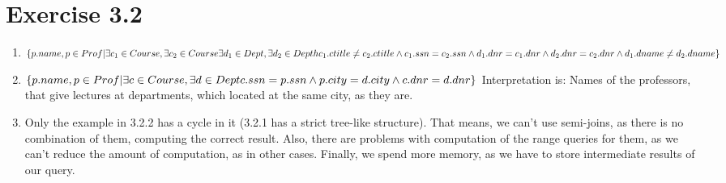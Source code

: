 \documentclass[10pt]{article}
\begin{document}
  \section*{Exercise 3.2}
  \begin{enumerate}[label=\arabic*.]
    \item
		$\{p.name, p \in Prof | \exists c_1 \in Course, \exists c_2 \in Course \exists d_1 \in Dept, \exists d_2 \in Depth \\
        c_1.ctitle \neq c_2.ctitle \wedge c_1.ssn = c_2.ssn \wedge d_1.dnr = c_1.dnr \wedge d_2.dnr=c_2.dnr \wedge d_1.dname \neq d_2.dname\}$
    \item
    	$\{p.name, p \in Prof | \exists c \in Course, \exists d \in Dept\\
        c.ssn = p.ssn \wedge p.city = d.city \wedge c.dnr = d.dnr\}$
        Interpretation is: Names of the professors, that give lectures at departments, which located at the same city, as they are.

    \item
  		Only the example in 3.2.2 has a cycle in it (3.2.1 has a strict tree-like structure). That means, we can't use semi-joins, as there is no combination of them, computing the correct result. Also, there are problems with computation of the range queries for them, as we can't reduce the amount of computation, as in other cases. Finally, we spend more memory, as we have to store intermediate results of our query.
  \end{enumerate}
\end{document}
